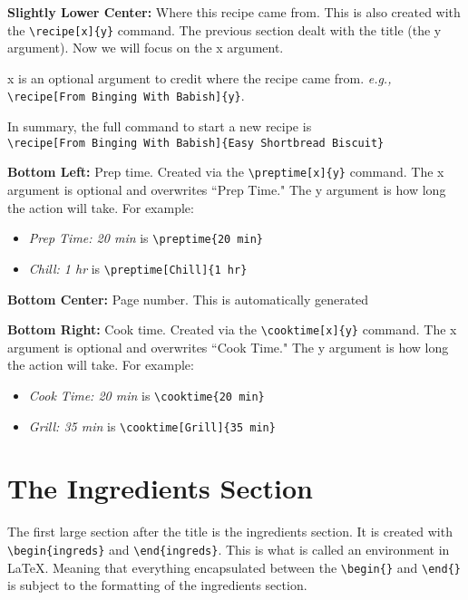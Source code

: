 \noindent \textbf{Slightly Lower Center:} Where this recipe came from. This is also created with the \verb|\recipe[x]{y}| command. The previous section dealt with the title (the y argument). Now we will focus on the x argument. 

\par x is an optional argument to credit where the recipe came from. \textit{e.g.,} \verb|\recipe[From Binging With Babish]{y}|.
\par In summary, the full command to start a new recipe is \\ \verb|\recipe[From Binging With Babish]{Easy Shortbread Biscuit}| \\
\vspace{.1 cm}

\noindent \textbf{Bottom Left:} Prep time. Created via the \verb|\preptime[x]{y}| command. The x argument is optional and overwrites ``Prep Time." The y argument is how long the action will take. For example:
\begin{itemize}
    \item \textit{Prep Time: 20 min} is \verb|\preptime{20 min}|
    \item \textit{Chill: 1 hr} is \verb|\preptime[Chill]{1 hr}|
\end{itemize} 
\vspace{.1 cm}

\noindent \textbf{Bottom Center:} Page number. This is automatically generated\\
\vspace{.1 cm}

\noindent \textbf{Bottom Right:} Cook time. Created via the \verb|\cooktime[x]{y}| command. The x argument is optional and overwrites ``Cook Time." The y argument is how long the action will take. For example:
\begin{itemize}
    \item \textit{Cook Time: 20 min} is \verb|\cooktime{20 min}|
    \item \textit{Grill: 35 min} is \verb|\cooktime[Grill]{35 min}|
\end{itemize}

\newpage
\section*{The Ingredients Section}

The first large section after the title is the ingredients section. It is created with \verb|\begin{ingreds}| and \verb|\end{ingreds}|. This is what is called an environment in \LaTeX. Meaning that everything encapsulated between the \verb|\begin{}| and \verb|\end{}| is subject to the formatting of the ingredients section. 

